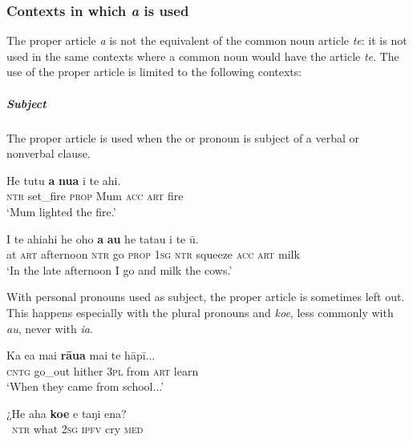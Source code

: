 \subsubsection[Contexts in which a is used]{Contexts in which \textit{a} is used}\label{sec:5.13.2.1}

The proper article \textit{a} is not the  equivalent of the common noun article \textit{te}: it is not used in the same contexts where a common noun would have the article \textit{te}. The use of the proper article is limited to the following contexts:

\subparagraph{Subject} The proper article is used when the  or pronoun is subject of a verbal or nonverbal clause.

\ea\label{ex:5.186}
\gll He tutu \textbf{a} \textbf{nua} i te ahi. \\
\textsc{ntr} set\_fire \textsc{prop} Mum \textsc{acc} \textsc{art} fire \\

\glt 
‘Mum lighted the fire.’ \textstyleExampleref{[R232.047]} 
\z

\ea\label{ex:5.187}
\gll {\ꞌ}I te ahiahi he oho \textbf{a} \textbf{au} he tatau i te ū.\\
at \textsc{art} afternoon \textsc{ntr} go \textsc{prop} \textsc{1sg} \textsc{ntr} squeeze \textsc{acc} \textsc{art} milk\\

\glt
‘In the late afternoon I go and milk the cows.’ \textstyleExampleref{[R334.277]} 
\z

With personal pronouns used as subject, the proper article is sometimes left out. This happens especially with the plural pronouns and \textit{koe}, less commonly with \textit{au}, never with \textit{ia}. 

\ea\label{ex:5.188}
\gll Ka e{\ꞌ}a mai \textbf{rāua} mai te hāpī... \\
\textsc{cntg} go\_out hither \textsc{3pl} from \textsc{art} learn \\

\glt 
‘When they came from school...’ \textstyleExampleref{[R381.012]} 
\z

\ea\label{ex:5.189}
\gll ¿He aha \textbf{koe} e taŋi ena? \\
~\textsc{ntr} what \textsc{2sg} \textsc{ipfv} cry \textsc{med} \\


